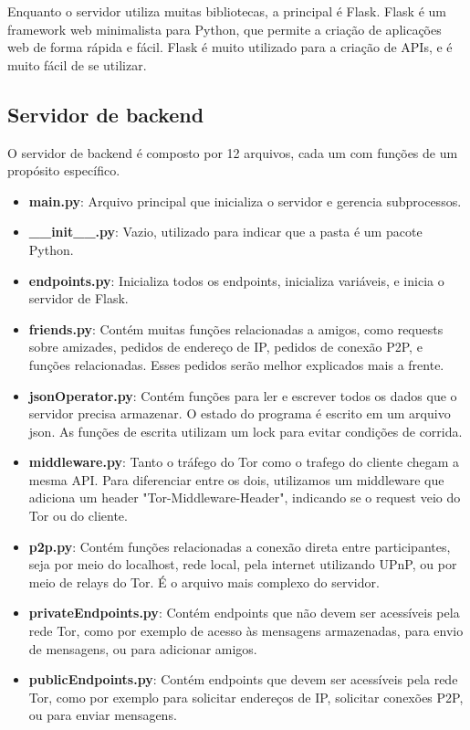Enquanto o servidor utiliza muitas bibliotecas, a principal é Flask. Flask é um framework web minimalista para Python, que permite a criação de aplicações web de forma rápida e fácil. Flask é muito utilizado para a criação de APIs, e é muito fácil de se utilizar.

\subsection{Servidor de backend}

O servidor de backend é composto por 12 arquivos, cada um com funções de um propósito específico.

\begin{itemize}
    \item \textbf{main.py}: Arquivo principal que inicializa o servidor e gerencia subprocessos.
    \item \textbf{\_\_init\_\_.py}: Vazio, utilizado para indicar que a pasta é um pacote Python.
    \item \textbf{endpoints.py}: Inicializa todos os endpoints, inicializa variáveis, e inicia o servidor de Flask.
    \item \textbf{friends.py}: Contém muitas funções relacionadas a amigos, como requests sobre amizades, pedidos de endereço de IP, pedidos de conexão P2P, e funções relacionadas. Esses pedidos serão melhor explicados mais a frente.
    \item \textbf{jsonOperator.py}: Contém funções para ler e escrever todos os dados que o servidor precisa armazenar. O estado do programa é escrito em um arquivo json. As funções de escrita utilizam um lock para evitar condições de corrida.
    \item \textbf{middleware.py}: Tanto o tráfego do Tor como o trafego do cliente chegam a mesma API. Para diferenciar entre os dois, utilizamos um middleware que adiciona um header "Tor-Middleware-Header", indicando se o request veio do Tor ou do cliente.
    \item \textbf{p2p.py}: Contém funções relacionadas a conexão direta entre participantes, seja por meio do localhost, rede local, pela internet utilizando UPnP, ou por meio de relays do Tor. É o arquivo mais complexo do servidor.
    \item \textbf{privateEndpoints.py}: Contém endpoints que não devem ser acessíveis pela rede Tor, como por exemplo de acesso às mensagens armazenadas, para envio de mensagens, ou para adicionar amigos.
    \item \textbf{publicEndpoints.py}: Contém endpoints que devem ser acessíveis pela rede Tor, como por exemplo para solicitar endereços de IP, solicitar conexões P2P, ou para enviar mensagens.

\end{itemize}
